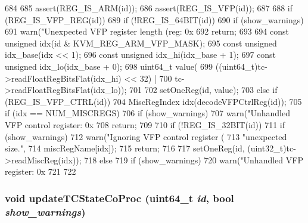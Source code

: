 \begin{DoxyCode}
684 {
685     assert(REG_IS_ARM(id));
686     assert(REG_IS_VFP(id));
687 
688     if (REG_IS_VFP_REG(id)) {
689         if (!REG_IS_64BIT(id)) {
690             if (show_warnings)
691                 warn("Unexpected VFP register length (reg: 0x%
692             return;
693         }
694         const unsigned idx(id & KVM_REG_ARM_VFP_MASK);
695         const unsigned idx_base(idx << 1);
696         const unsigned idx_hi(idx_base + 1);
697         const unsigned idx_lo(idx_base + 0);
698         uint64_t value(
699             ((uint64_t)tc->readFloatRegBitsFlat(idx_hi) << 32) |
700             tc->readFloatRegBitsFlat(idx_lo));
701 
702         setOneReg(id, value);
703     } else if (REG_IS_VFP_CTRL(id)) {
704         MiscRegIndex idx(decodeVFPCtrlReg(id));
705         if (idx == NUM_MISCREGS) {
706             if (show_warnings)
707                 warn("Unhandled VFP control register: 0x%
708             return;
709         }
710         if (!REG_IS_32BIT(id)) {
711             if (show_warnings)
712                 warn("Ignoring VFP control register (%
713                      "unexpected size.\n",
714                      miscRegName[idx]);
715             return;
716         }
717         setOneReg(id, (uint32_t)tc->readMiscReg(idx));
718     } else {
719         if (show_warnings)
720             warn("Unhandled VFP register: 0x%
721     }
722 }
\end{DoxyCode}
\hypertarget{classArmKvmCPU_a398ea9eff7b6848bc2c92fe43999011d}{
\subsubsection[{updateTCStateCoProc}]{\setlength{\rightskip}{0pt plus 5cm}void updateTCStateCoProc (uint64\_\-t {\em id}, \/  bool {\em show\_\-warnings})}}
\label{classArmKvmCPU_a398ea9eff7b6848bc2c92fe43999011d}



